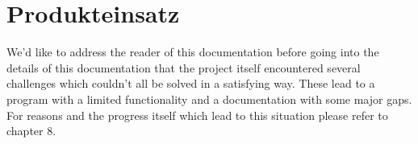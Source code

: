 \section{Produkteinsatz}
\label{sec:Produkteinsatz}

We'd like to address the reader of this documentation before going into the details of this documentation that the project itself encountered several challenges which couldn't all be solved in a satisfying way. These lead to a program with a limited functionality and a documentation with some major gaps. For reasons and the progress itself which lead to this situation please refer to chapter 8.